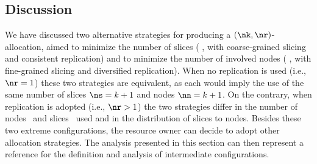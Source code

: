 \subsection{Discussion}
We have discussed two alternative strategies for producing a
$(\nk,\nr)$-allocation, aimed to minimize the number of slices (
  \diagonal, with coarse-grained slicing and consistent
replication) and to minimize the number of involved nodes (\compact
    , with fine-grained slicing and diversified
  replication).  When no replication is used (i.e., $\nr=1$) these two
  strategies are equivalent, as each would imply the use of the same
  number of slices $\ns=k+1$ and nodes $\nn=k+1$. On the contrary,
  when replication is adopted (i.e., $\nr>1$) the two strategies
  differ in the number of nodes \nn\ and slices \ns\ used and in the
  distribution of slices to nodes. Besides these two extreme
  configurations, the resource owner can decide to adopt other
  allocation strategies. The analysis presented in this section can
  then represent a reference for the definition and analysis of
  intermediate configurations.

